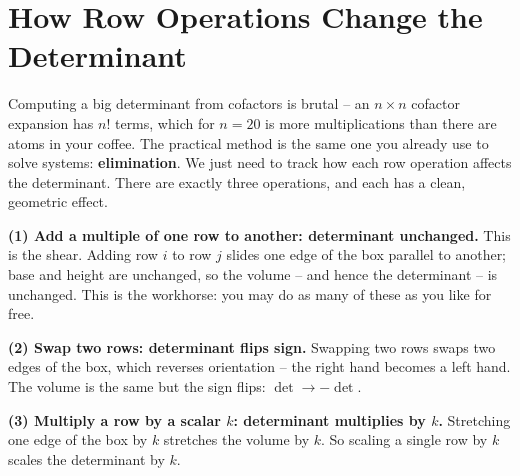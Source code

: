 \section{How Row Operations Change the Determinant}
\label{ch21:row-ops}

Computing a big determinant from cofactors is brutal -- an $n\times n$ cofactor
expansion has $n!$ terms, which for $n = 20$ is more multiplications than there
are atoms in your coffee. The practical method is the same one you already use to
solve systems: \textbf{elimination}. We just need to track how each row operation
affects the determinant. There are exactly three operations, and each has a clean,
geometric effect.

\textbf{(1) Add a multiple of one row to another: determinant unchanged.}
This is the shear. Adding row $i$ to row $j$ slides one edge of the box parallel to
another; base and height are unchanged, so the volume -- and hence the
determinant -- is unchanged. This is the workhorse: you may do as many of these as
you like for free.

\textbf{(2) Swap two rows: determinant flips sign.}
Swapping two rows swaps two edges of the box, which reverses orientation -- the
right hand becomes a left hand. The volume is the same but the sign flips:
$\det \to -\det$.

\textbf{(3) Multiply a row by a scalar $k$: determinant multiplies by $k$.}
Stretching one edge of the box by $k$ stretches the volume by $k$. So scaling a
single row by $k$ scales the determinant by $k$.

